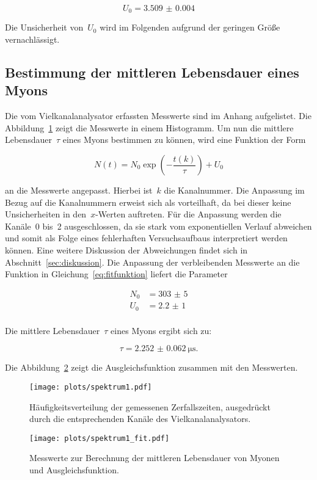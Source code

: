 \begin{equation}
  U_0=\num{3.509(4)}
  \label{eq:untergrund_kanal}
\end{equation}

Die Unsicherheit von~$U_0$ wird im Folgenden aufgrund der geringen Größe
vernachlässigt.

\subsection{Bestimmung der mittleren Lebensdauer eines Myons}
Die vom Vielkanalanalysator erfassten Messwerte sind im Anhang aufgelistet.
Die Abbildung~\ref{fig:spektrum1} zeigt die Messwerte in einem Histogramm. Um nun
die mittlere Lebensdauer~$\tau$ eines Myons bestimmen zu können, wird eine Funktion
der Form

\begin{equation}
  N(t)=N_0\exp\left(-\frac{t(k)}{\tau}\right)+U_0
  \label{eq:fitfunktion}
\end{equation}

an die Messwerte angepasst. Hierbei ist~$k$ die Kanalnummer. Die
Anpassung im Bezug auf die Kanalnummern erweist sich als vorteilhaft, da bei
dieser keine Unsicherheiten in den~$x$-Werten auftreten. Für die Anpassung werden die
Kanäle~\num{0} bis~\num{2} ausgeschlossen, da sie stark vom exponentiellen Verlauf
abweichen und somit als Folge eines fehlerhaften Versuchsaufbaus interpretiert
werden können. Eine weitere Diskussion der Abweichungen findet sich in
Abschnitt~\ref{sec:diskussion}. Die Anpassung der
verbleibenden Messwerte an die Funktion in Gleichung~\ref{eq:fitfunktion}
liefert die Parameter

\begin{align}
  N_0&=\num{303(5)} \\
  U_0&=\num{2.2(10)}\\
  \label{eq:fitparameter}
\end{align}

Die mittlere Lebensdauer~$\tau$ eines Myons ergibt sich zu:

\begin{equation}
  \tau=\SI{2.252(62)}{\micro\second}.
  \label{eq:ergebnis}
\end{equation}

Die Abbildung~\ref{fig:spektrum3} zeigt die Ausgleichsfunktion zusammen mit den
Messwerten.

\begin{figure}[htb]
  \centering
  \texttt{[image: plots/spektrum1.pdf]}
  \caption{Häufigkeitsverteilung der gemessenen Zerfallszeiten, ausgedrückt
  durch die entsprechenden Kanäle des Vielkanalanalysators.}
  \label{fig:spektrum1}
\end{figure}

\begin{figure}[htb]
  \centering
  \texttt{[image: plots/spektrum1\_fit.pdf]}
  \caption{Messwerte zur Berechnung der mittleren Lebensdauer von Myonen und
  Ausgleichsfunktion.}
  \label{fig:spektrum3}
\end{figure}
